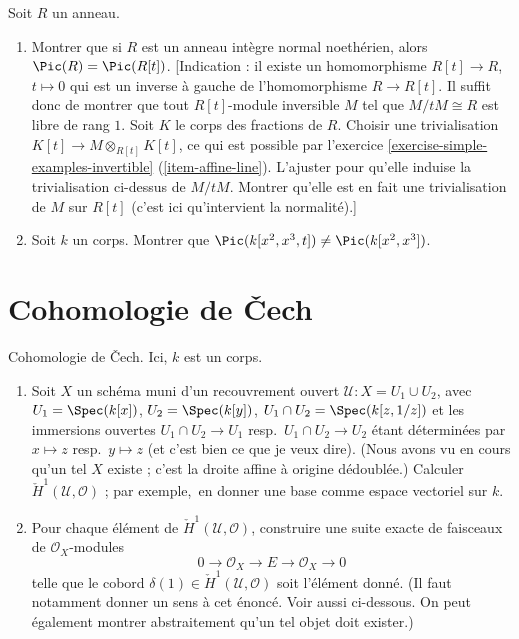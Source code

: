 \begin{exercise}
\label{exercise-traverso}
Soit $R$ un anneau.
\begin{enumerate}
\item Montrer que si $R$ est un anneau intègre normal noethérien, alors
$\Pic(R) = \Pic(R[t])$. [Indication : il existe un homomorphisme
$R[t] \to R$, $t \mapsto 0$ qui est un inverse à gauche de l'homomorphisme
$R \to R[t]$. Il suffit donc de montrer que tout
$R[t]$-module inversible $M$ tel que $M/tM \cong R$ est libre de rang $1$.
Soit $K$ le corps des fractions de $R$.
Choisir une trivialisation $K[t] \to M \otimes_{R[t]} K[t]$, ce qui est possible par
l'exercice \ref{exercise-simple-examples-invertible} (\ref{item-affine-line}).
L'ajuster pour qu'elle induise la trivialisation
ci-dessus de $M/tM$. Montrer qu'elle est en fait une trivialisation de
$M$ sur $R[t]$ (c'est ici qu'intervient la normalité).]
\item Soit $k$ un corps. Montrer que
$\Pic(k[x^2, x^3, t]) \not = \Pic(k[x^2, x^3])$.
\end{enumerate}
\end{exercise}













\section{Cohomologie de {\v C}ech}
\label{section-cech-cohomology}

\begin{exercise}
\label{exercise-cech-cohomology}
Cohomologie de {\v C}ech. Ici, $k$ est un corps.
\begin{enumerate}
\item Soit $X$ un schéma muni d'un recouvrement ouvert
${\mathcal U} : X = U_1 \cup U_2$, avec $U_1 = \Spec(k[x])$,
$U_2 =  \Spec(k[y])$,
$U_1 \cap U_2 = \Spec(k[z, 1/z])$ et les immersions ouvertes
$U_1 \cap U_2 \to U_1$ resp.\ $U_1 \cap U_2 \to U_2$ étant déterminées
par $x \mapsto z$ resp.\ $y \mapsto z$ (et c'est bien ce que je veux dire).
(Nous avons vu en cours qu'un tel $X$ existe ; c'est la droite affine
à origine dédoublée.) Calculer ${\check H}^1({\mathcal U}, {\mathcal
O})$ ;
par exemple,\ en donner une base comme espace vectoriel sur $k$.
\item Pour chaque élément de
${\check H}^1({\mathcal U}, {\mathcal O})$,
construire une suite exacte de faisceaux de ${\mathcal O}_X$-modules
$$
0 \to {\mathcal O}_X \to E \to {\mathcal O}_X \to 0
$$
telle que le cobord $\delta(1) \in {\check H}^1({\mathcal U},
{\mathcal O})$
soit l'élément donné. (Il faut notamment donner un sens à cet énoncé.
Voir aussi ci-dessous.
On peut également montrer abstraitement qu'un tel objet doit exister.)
\end{enumerate}
\end{exercise}

